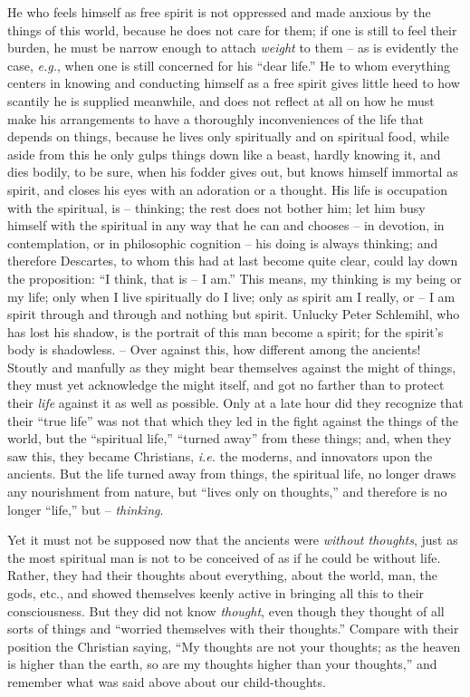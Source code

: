 He who feels himself as free spirit is not oppressed and made anxious by the 
things of this world, because he does not care for them; if one is still to 
feel their burden, he must be narrow enough to attach \textit{weight} to them 
-- as is evidently the case, \textit{e.g.}, when one is still concerned for 
his ``dear life.'' He to whom everything centers in knowing and conducting 
himself as a free spirit gives little heed to how scantily he is supplied 
meanwhile, and does not reflect at all on how he must make his arrangements to 
have a thoroughly inconveniences of the life that depends on things, because 
he lives only spiritually and on spiritual food, while aside from this he only 
gulps things down like a beast, hardly knowing it, and dies bodily, to be 
sure, when his fodder gives out, but knows himself immortal as spirit, and 
closes his eyes with an adoration or a thought. His life is occupation with 
the spiritual, is -- thinking; the rest does not bother him; let him busy 
himself with the spiritual in any way that he can and chooses -- in devotion, 
in contemplation, or in philosophic cognition -- his doing is always thinking; 
and therefore Descartes, to whom this had at last become quite clear, could 
lay down the proposition: ``I think, that is -- I am.'' This means, my 
thinking is my being or my life; only when I live spiritually do I live; only 
as spirit am I really, or -- I am spirit through and through and nothing but 
spirit. Unlucky Peter Schlemihl, who has lost his shadow, is the portrait of 
this man become a spirit; for the spirit's body is shadowless. -- Over against 
this, how different among the ancients! Stoutly and manfully as they might 
bear themselves against the might of things, they must yet acknowledge the 
might itself, and got no farther than to protect their \textit{life} against 
it as well as possible. Only at a late hour did they recognize that their 
``true life'' was not that which they led in the fight against the things of 
the world, but the ``spiritual life,'' ``turned away'' from these things; 
and, when they saw this, they became Christians, \textit{i.e.} the moderns, 
and innovators upon the ancients. But the life turned away from things, the 
spiritual life, no longer draws any nourishment from nature, but ``lives only 
on thoughts,'' and therefore is no longer ``life,'' but -- 
\textit{thinking}.

Yet it must not be supposed now that the ancients were \textit{without 
thoughts}, just as the most spiritual man is not to be conceived of as if he 
could be without life. Rather, they had their thoughts about everything, about 
the world, man, the gods, etc., and showed themselves keenly active in 
bringing all this to their consciousness. But they did not know 
\textit{thought}, even though they thought of all sorts of things and 
``worried themselves with their thoughts.'' Compare with their position the 
Christian saying, ``My thoughts are not your thoughts; as the heaven is 
higher than the earth, so are my thoughts higher than your thoughts,'' and 
remember what was said above about our child-thoughts.


